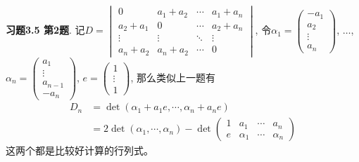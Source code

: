 {\bf 习题3.5 第2题}. 记$D = \begin{vmatrix} 0 & a_1+a_2 & \cdots & a_1+a_n \\ a_2+a_1 & 0 & \cdots & a_2+a_n \\ \vdots & \vdots & \ddots & \vdots \\ a_n+a_2 & a_n+a_2 & \cdots & 0 \end{vmatrix}$, 令$\alpha_1 = \begin{pmatrix} -a_1 \\ a_2 \\ \vdots \\ a_n \end{pmatrix}$, $\ldots$, $\alpha_n = \begin{pmatrix} a_1 \\ \vdots \\ a_{n-1} \\ -a_n \end{pmatrix}$, $e = \begin{pmatrix} 1 \\ \vdots \\ 1 \end{pmatrix}$, 那么类似上一题有
\begin{align*}
D_n & = \det(\alpha_1 + a_1e, \cdots, \alpha_n + a_ne) \\
& = 2\det(\alpha_1, \cdots, \alpha_n) - \det\begin{pmatrix} 1 & a_1 & \cdots & a_n \\ e & \alpha_1 & \cdots & \alpha_n \end{pmatrix}
\end{align*}
这两个都是比较好计算的行列式。



